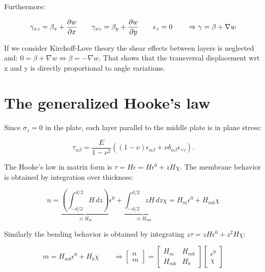 	Furthermore: 
	
	\begin{equation}
	\gamma _{xz} = \beta _x +\frac{\partial w}{\partial x}\qquad \gamma _{xz} = \beta _y +\frac{\partial w}{\partial y} \qquad \epsilon _z = 0 \qquad \Rightarrow \gamma = \beta + \nabla w
	\end{equation}
	
	If we consider Kirchoff-Love theory the shear effects between layers is neglected and: $0 = \beta + \nabla w \Leftrightarrow \beta = -\nabla w$. That shows that the transversal displacement wrt x and y is directly proportional to angle variations. 
	
\section{The generalized Hooke's law}
	Since $\sigma _z = 0$ in the plate, each layer parallel to the middle plate is in plane stress: 
	
	\begin{equation}
	\tau _{\alpha \beta} = \frac{E}{1-\nu ^2} \left( (1-\nu)\epsilon _{\alpha \beta} + \nu \delta _{\alpha \beta}\epsilon _{\gamma \gamma} \right).
	\end{equation}
	
	The Hooke's law in matrix form is $\tau = H \epsilon = H \epsilon ^0 + zH\chi$. The membrane behavior is obtained by integration over thickness: 
	
	\begin{equation}
	n = \underbrace{\left(\int _{-d/2}^{d/2} H\, dz \right)}_{\equiv H_m}\epsilon ^0 + \underbrace{\int _{-d/2}^{d/2} zH\, dz}_{\equiv H_{mb}} \chi = H_{m} \epsilon ^0 + H_{mb} \chi
	\end{equation}
	
	Similarly the bending behavior is obtained by integrating $z\tau = z H \epsilon ^0 + z^2 H\chi$:
	
	\begin{equation}
	m = H_{mb} \epsilon ^0 + H_b \chi \qquad \Rightarrow \left[ 
	\begin{array}{c}
	n\\
	m
	\end{array}
	\right] = \left[ 
	\begin{array}{cc}
	H_{m} & H_{mb}\\
	H_{mb} & H_b
	\end{array}
	\right]
	\left[ 
	\begin{array}{c}
	\epsilon ^0\\
	\chi
	\end{array}
	\right]
	\end{equation}
	
